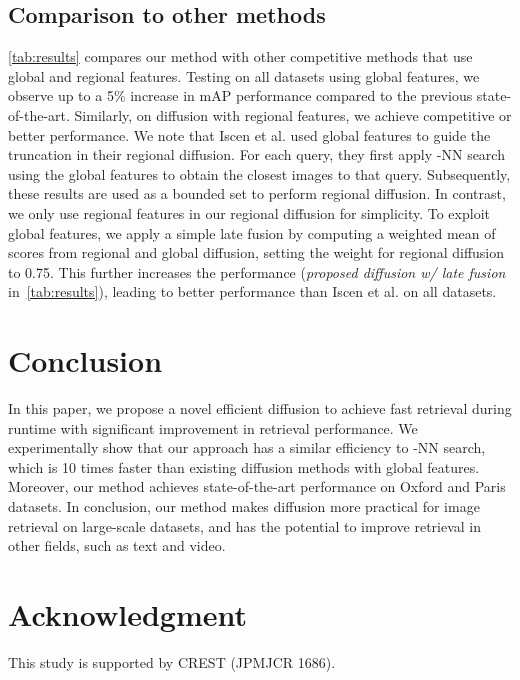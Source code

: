 \documentclass[letterpaper]{article} \usepackage{aaai19}  \usepackage{times}  \usepackage{helvet}  \usepackage{courier}  \usepackage{url}  \usepackage{graphicx}  \frenchspacing  \setlength{\pdfpagewidth}{8.5in}  \setlength{\pdfpageheight}{11in}
\begin{document}
\subsection{Comparison to other methods}
\cref{tab:results} compares our method with other competitive methods that use global and regional features. Testing on all datasets using global features, we observe up to a 5\% increase in mAP performance compared to the previous state-of-the-art. Similarly, on diffusion with regional features, we achieve competitive or better performance.
We note that Iscen et al. used global features to guide the truncation in their regional diffusion.
For each query, they first apply -NN search using the global features to obtain the closest images to that query.
Subsequently, these results are used as a bounded set to perform regional diffusion.
In contrast, we only use regional features in our regional diffusion for simplicity.
To exploit global features, we apply a simple late fusion by computing a weighted mean of scores from regional and global diffusion, setting the weight for regional diffusion to 0.75.
This further increases the performance (\textit{proposed diffusion w/ late fusion} in~\cref{tab:results}), leading to better performance than Iscen et al. on all datasets.


\section{Conclusion}

In this paper, we propose a novel efficient diffusion to achieve fast retrieval during runtime with significant improvement in retrieval performance.
We experimentally show that our approach has a similar efficiency to -NN search, which is 10 times faster than existing diffusion methods with global features.
Moreover, our method achieves state-of-the-art performance on Oxford and Paris datasets.
In conclusion, our method makes diffusion more practical for image retrieval on large-scale datasets, and has the potential to improve retrieval in other fields, such as text and video.

\section{Acknowledgment}

This study is supported by CREST (JPMJCR 1686).

\clearpage



\end{document}
